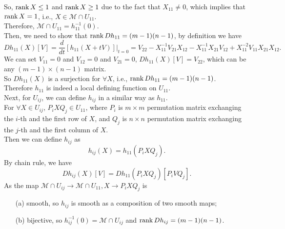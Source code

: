 \documentclass[en, oneside]{assignment}
\begin{document}
\begin{sol}
\begin{itemize}
\begin{equation*}
        \end{equation*}
        So, $\operatorname{rank}{X} \leq 1$ and $\operatorname{rank}{X} \geq 1$ due to the fact that $X_{11} \neq 0$, 
        which implies that $\operatorname{rank}{X} = 1$, i.e., $X \in \mathcal{M} \cap U_{11}$.\\
        Therefore, $\mathcal{M} \cap U_{11} = h_{11}^{-1}\left(0\right)$.\\
        Then, we need to show that $\operatorname{rank}{Dh_{11}} = (m-1)(n-1)$, by definition we have
        \begin{equation*}
            Dh_{11}(X)[V] = \frac{d}{d t}\left[h_{11}(X + tV)\right]|_{t=0} = 
            V_{22} - X_{11}^{-1}V_{21}X_{12} - X_{11}^{-1}X_{21}V_{12} + X_{11}^{-2}V_{11}X_{21}X_{12}.
        \end{equation*}
        We can set $V_{11} = 0$ and $V_{12} = 0$ and $V_{21} = 0$, $Dh_{11}(X)[V] = V_{22}$, 
        which can be any $(m-1) \times (n-1)$ matrix.\\
        So $Dh_{11}(X)$ is a surjection for $\forall X$, i.e., $\operatorname{rank}{Dh_{11}} = (m-1)(n-1)$.\\
        Therefore $h_{11}$ is indeed a local defining function on $U_{11}$.\\
        Next, for $U_{ij}$, we can define $h_{ij}$ in a similar way as $h_{11}$.\\
        For $\forall X \in U_{ij}$, $P_i X Q_j \in U_{11}$,
        where $P_i$ is $m \times m$ permutation matrix exchanging the $i$-th and the first row of $X$,
        and $Q_j$ is $n \times n$ permutation matrix exchanging the $j$-th and the first column of $X$.\\
        Then we can define $h_{ij}$ as
        \begin{equation*}
            h_{ij}(X) = h_{11}(P_i X Q_j).
        \end{equation*}
        By chain rule, we have
        \begin{equation*}
            Dh_{ij}(X)[V] = Dh_{11}(P_i X Q_j)[P_i V Q_j].
        \end{equation*}
        As the map $\mathcal{M} \cap U_{ij} \to \mathcal{M} \cap U_{11}, X \to P_i X Q_j$ is
        \begin{itemize}
            \item[(a)] smooth, so $h_{ij}$ is smooth as a composition of two smooth maps;
            \item[(b)] bijective, so $h_{ij}^{-1}(0) = \mathcal{M} \cap U_{ij}$ and $\operatorname{rank}{Dh_{ij}} = (m-1)(n-1)$.
        \end{itemize}

\end{itemize}
\end{sol}
\end{document}
